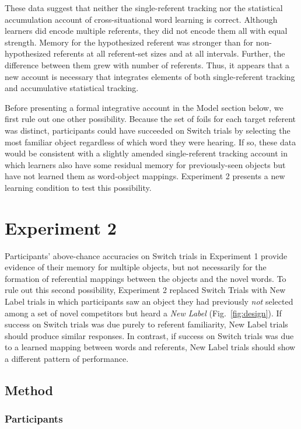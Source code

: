 \documentclass[man,floatsintext]{apa6}
\begin{document}
These data suggest that neither the single-referent tracking nor the statistical accumulation account of cross-situational word learning is correct. Although learners did encode multiple referents, they did not encode them all with equal strength. Memory for the hypothesized referent was stronger than for non-hypothesized referents at all referent-set sizes and at all intervals. Further, the difference between them grew with number of referents. Thus, it appears that a new account is necessary that integrates elements of both single-referent tracking and accumulative statistical tracking.

Before presenting a formal integrative account in the Model section below, we first rule out one other possibility. Because the set of foils for each target referent was distinct, participants could have succeeded on Switch trials by selecting the most familiar object regardless of which word they were hearing. If so, these data would be consistent with a slightly amended single-referent tracking account in which learners also have some residual memory for previously-seen objects but have not learned them as word-object mappings. Experiment 2 presents a new learning condition to test this possibility.

\section{Experiment 2}

Participants' above-chance accuracies on Switch trials in Experiment 1 provide evidence of their memory for multiple objects, but not necessarily for the formation of referential mappings between the objects and the novel words. To rule out this second possibility, Experiment 2 replaced Switch Trials with New Label trials in which participants saw an object they had previously \emph{not} selected among a set of novel competitors but heard a \emph{New Label} (Fig.~\ref{fig:design}). If success on Switch trials was due purely to referent familiarity, New Label trials should produce similar responses. In contrast, if success on Switch trials was due to a learned mapping between words and referents, New Label trials should show a different pattern of performance.

\subsection{Method}

\subsubsection{Participants}
\end{document}

